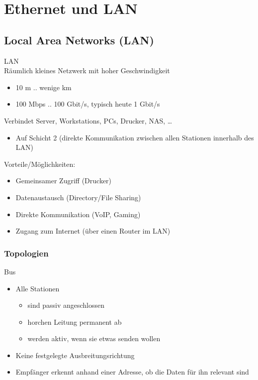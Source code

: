 \section{Ethernet und LAN}
\subsection{Local Area Networks (LAN)}

\begin{definition}{LAN}\\
    Räumlich kleines Netzwerk mit hoher Geschwindigkeit
    \begin{itemize}
        \item 10 m .. wenige km
        \item 100 Mbps .. 100 Gbit/s, typisch heute 1 Gbit/s
    \end{itemize}
    Verbindet Server, Workstations, PCs, Drucker, NAS, …
    \begin{itemize}
        \item Auf Schicht 2 (direkte Kommunikation zwischen allen Stationen innerhalb des LAN)
    \end{itemize}
    Vorteile/Möglichkeiten:
    \begin{itemize}
        \item Gemeinsamer Zugriff (Drucker)
        \item Datenaustausch (Directory/File Sharing)
        \item Direkte Kommunikation (VoIP, Gaming)
        \item Zugang zum Internet (über einen Router im LAN)
    \end{itemize}
\end{definition}

\subsubsection{Topologien}

\begin{definition}{Bus}
    \begin{itemize}
        \item Alle Stationen
        \begin{itemize}
            \item sind passiv angeschlossen
            \item horchen Leitung permanent ab
            \item werden aktiv, wenn sie etwas senden wollen
        \end{itemize}
        \item Keine festgelegte Ausbreitungsrichtung
        \item Empfänger erkennt anhand einer Adresse, ob die Daten für ihn relevant sind
    \end{itemize}
\end{definition}

